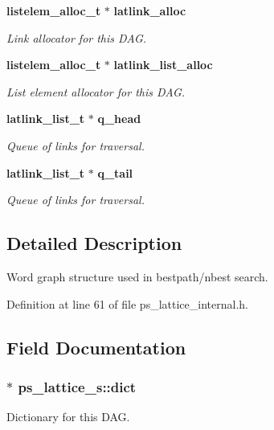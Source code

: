 \begin{DoxyCompactItemize}
{\bf listelem\-\_\-alloc\-\_\-t} $\ast$ {\bf latlink\-\_\-alloc}
\begin{DoxyCompactList}\small\item\em \-Link allocator for this \-D\-A\-G. \end{DoxyCompactList}\item 
{\bf listelem\-\_\-alloc\-\_\-t} $\ast$ {\bf latlink\-\_\-list\-\_\-alloc}
\begin{DoxyCompactList}\small\item\em \-List element allocator for this \-D\-A\-G. \end{DoxyCompactList}\item 
{\bf latlink\-\_\-list\-\_\-t} $\ast$ {\bf q\-\_\-head}
\begin{DoxyCompactList}\small\item\em \-Queue of links for traversal. \end{DoxyCompactList}\item 
{\bf latlink\-\_\-list\-\_\-t} $\ast$ {\bf q\-\_\-tail}
\begin{DoxyCompactList}\small\item\em \-Queue of links for traversal. \end{DoxyCompactList}\end{DoxyCompactItemize}


\subsection{\-Detailed \-Description}
\-Word graph structure used in bestpath/nbest search. 

\-Definition at line 61 of file ps\-\_\-lattice\-\_\-internal.\-h.



\subsection{\-Field \-Documentation}
\subsubsection[{dict}]{$\ast$ {\bf ps\-\_\-lattice\-\_\-s\-::dict}}\label{structps__lattice__s_a71865c59fae65743ef3c6b5aceb17da6}


\-Dictionary for this \-D\-A\-G. 



